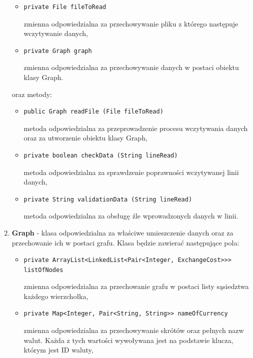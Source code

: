 ﻿\documentclass[12pt]{article}
\begin{document}
\begin{enumerate}
    \begin{itemize}
        \item \begin{verbatim}private File fileToRead\end{verbatim}
        zmienna odpowiedzialna za przechowywanie pliku z którego następuje wczytywanie danych,
    \item \begin{verbatim}private Graph graph\end{verbatim}
        zmienna odpowiedzialna za przechowywanie danych w postaci obiektu klasy Graph.
    \end{itemize}
    oraz metody:
    \begin{itemize}
        \item \begin{verbatim}public Graph readFile (File fileToRead)\end{verbatim}
        metoda odpowiedzialna za przeprowadzenie procesu wczytywania danych oraz za utworzenie obiektu klasy Graph,
        \item \begin{verbatim}private boolean checkData (String lineRead)\end{verbatim}
        metoda odpowiedzialna za sprawdzenie poprawności wczytywanej linii danych,
        \item \begin{verbatim}private String validationData (String lineRead)\end{verbatim}
        metoda odpowiedzialna za obsługę źle wprowadzonych danych w linii.
    \end{itemize}
\item \textbf{Graph} - klasa odpowiedzialna za właściwe umieszczenie danych oraz za przechowanie ich w postaci grafu. Klasa będzie zawierać następujące pola:
    \begin{itemize}
        \item \begin{verbatim}private ArrayList<LinkedList<Pair<Integer, ExchangeCost>>> listOfNodes\end{verbatim}
        zmienna odpowiedzialna za przechowanie grafu w postaci listy sąsiedztwa każdego wierzchołka,
    \item \begin{verbatim}private Map<Integer, Pair<String, String>> nameOfCurrency\end{verbatim}
        zmienna odpowiedzialna za przechowywanie skrótów oraz pełnych nazw walut. Każda z tych wartości wywoływana jest na podstawie klucza, którym jest ID waluty,

\end{itemize}
\end{enumerate}
\end{document}
